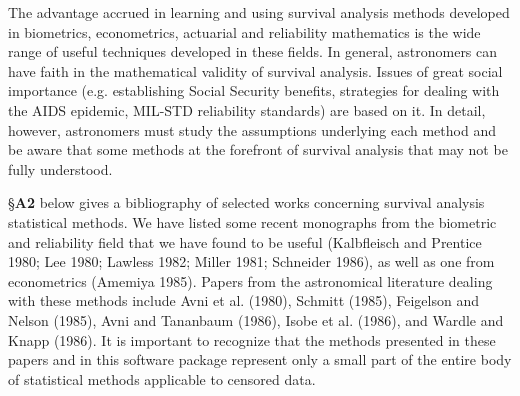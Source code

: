      The advantage accrued in learning and using survival analysis methods 
developed in biometrics, econometrics, actuarial and reliability
mathematics is the wide range of useful techniques developed in these 
fields. In general, astronomers can have faith in the mathematical validity
of survival analysis.  Issues of great social importance (e.g.
establishing Social Security benefits, strategies for dealing with the 
AIDS epidemic, MIL-STD reliability standards) are based on it. In detail,
however, astronomers must study the assumptions underlying each method and
be aware that some methods at the  forefront of survival analysis that may 
not be fully understood.
 
     \S {\bf A2} below gives a bibliography of selected works concerning 
survival analysis statistical methods.  We have listed some  recent
monographs from the biometric and reliability field that we have found to
be useful (Kalbfleisch and Prentice 1980; Lee 1980;  Lawless 1982; Miller
1981; Schneider 1986), as well as one from econometrics (Amemiya 1985). 
Papers from the astronomical literature dealing with these methods include
Avni et al. (1980), Schmitt (1985), Feigelson and Nelson (1985), Avni and 
Tananbaum (1986), Isobe et al. (1986), and Wardle and Knapp (1986).  It is
important to recognize that the methods presented in these papers and in 
this software package represent only a small part of the entire body of 
statistical methods applicable to censored data.


\bigskip
\bigskip
{}

